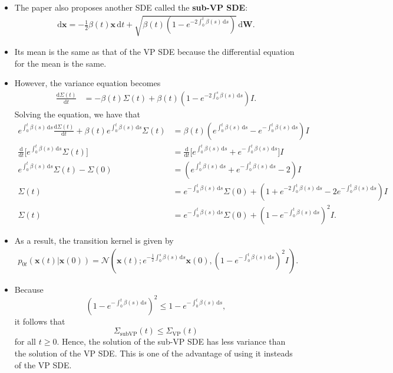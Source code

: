 \documentclass[10pt]{article}
\newcommand{\dee}{\mathrm{d}}
\newcommand{\ve}[1]{\mathbf{#1}}
\newcommand{\mrm}[1]{\mathrm{#1}}
\newcommand{\mcal}[1]{\mathcal{#1}}
\begin{document}
\begin{itemize}
  \item The paper also proposes another SDE called the {\bf sub-VP SDE}:
  \begin{align*}
    \dee \ve{x} = -\frac{1}{2} \beta(t)\ve{x}\, \dee t + \sqrt{\beta(t)(1 - e^{-2\int_0^t \beta(s)\, \dee s})}\, \dee\ve{W}.
  \end{align*}

  \item Its mean is the same as that of the VP SDE because the differential equation for the mean is the same.

  \item However, the variance equation becomes
  \begin{align*}
    \frac{\dee \Sigma(t)}{\dee t} 
    &= - \beta(t) \Sigma(t) + \beta(t) (1 - e^{-2 \int_0^s \beta(s)\, \dee s}) I.
  \end{align*}
  Solving the equation, we have that
  \begin{align*}
    e^{\int_0^t \beta(s)\, \dee s} \frac{\dee \Sigma(t)}{\dee t} + \beta(t) e^{\int_0^t \beta(s)\, \dee s} \Sigma(t) 
    &= \beta(t) (e^{\int_0^t \beta(s)\, \dee s} - e^{-\int_0^t \beta(s)\, \dee s}) I \\
    \frac{\dee}{\dee t} \bigg[ e^{\int_0^t \beta(s)\, \dee s} \Sigma(t) \bigg]
    &= \frac{\dee}{\dee t}\Big[e^{\int_0^t \beta(s)\, \dee s} + e^{-\int_0^t \beta(s)\, \dee s}  \Big] I \\
    e^{\int_0^t \beta(s)\, \dee s} \Sigma(t) - \Sigma(0)
    &= (e^{\int_0^t \beta(s)\, \dee s} + e^{-\int_0^t \beta(s)\, \dee s} - 2) I \\
    \Sigma(t) 
    &= e^{-\int_0^t \beta(s)\, \dee s} \Sigma(0) + (1 + e^{-2\int_0^t \beta(s)\, \dee s} - 2e^{-\int_0^t \beta(s)\, \dee s}) I \\
    \Sigma(t) 
    &= e^{-\int_0^t \beta(s)\, \dee s} \Sigma(0) + (1 - e^{-\int_0^t \beta(s)\, \dee s})^2 I.
  \end{align*}

  \item As a result, the transition kernel is given by
  \begin{align*}
    p_{0t}(\ve{x}(t)|\ve{x}(0)) = \mcal{N}(\ve{x}(t); e^{-\frac{1}{2} \int_0^s \beta(s)\, \dee s} \ve{x}(0), (1 - e^{-\int_0^t \beta(s)\, \dee s})^2 I).
  \end{align*}
   
  \item Because $$(1 - e^{-\int_0^t \beta(s)\, \dee s})^2 \leq 1 - e^{-\int_0^t \beta(s)\, \dee s},$$ it follows that $$\Sigma_{\mrm{subVP}}(t) \leq \Sigma_{\mrm{VP}}(t)$$ for all $t \geq 0$. Hence, the solution of the sub-VP SDE has less variance than the solution of the VP SDE. This is one of the advantage of using it insteads of the VP SDE.
\end{itemize}
\end{document}
